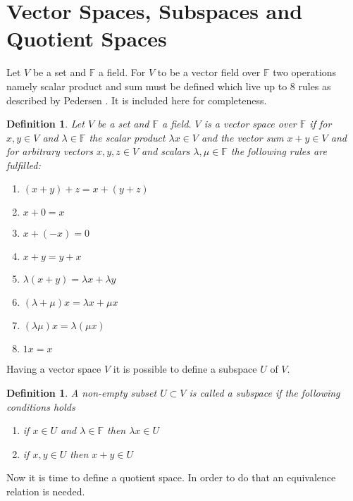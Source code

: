 \documentclass[11pt,a4paper,twoside]{report}
\newtheorem{mydef}[mythm]{Definition}
\begin{document}
\section{Vector Spaces, Subspaces and Quotient Spaces}
Let $V$ be a set and $\mathbb{F}$ a field. For $V$ to be a vector field over $\mathbb{F}$ two operations namely scalar product and sum must be defined which live up to 8 rules as described by Pedersen \cite[pp. 85-86]{LinAlg}. It is included here for completeness.
\begin{mydef} 
Let $V$ be a set and $\mathbb{F}$ a field. $V$ is a vector space over $\mathbb{F}$ if for $x,y\in V$ and $\lambda\in\mathbb{F}$ the scalar product $\lambda x\in V$ and the vector sum $x+y\in V$ and for arbitrary vectors $x,y,z\in V$ and scalars $\lambda,\mu\in\mathbb{F}$ the following rules are fulfilled:
\begin{enumerate}
\item $(x+y)+z = x+(y+z)$
\item $x+0=x$
\item $x+(-x)=0$
\item $x+y=y+x$
\item $\lambda(x+y)=\lambda x+\lambda y$
\item $(\lambda+\mu)x=\lambda x + \mu x$
\item $(\lambda\mu)x=\lambda(\mu x)$
\item $1x=x$
\end{enumerate}
\end{mydef}
Having a vector space $V$ it is possible to define a subspace $U$ of $V$.\cite[p.93]{LinAlg}
\begin{mydef}
A non-empty subset $U\subset V$ is called a subspace if the following conditions holds
\begin{enumerate}
\item if $x\in U$ and $\lambda\in\mathbb{F}$ then $\lambda x\in U$
\item if $x,y\in U$ then $x+y\in U$
\end{enumerate} 
\end{mydef}
Now it is time to define a quotient space. In order to do that an equivalence relation is needed. 
\end{document}
